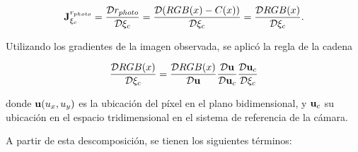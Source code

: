 \begin{equation}
\mathbf{J}_{\xi_c}^{r_{photo}} = \frac{\mathcal{D}r_{photo}}{\mathcal{D}\xi_c} = 
\frac{\mathcal{D}(RGB(x) - C(x))}{\mathcal{D}\xi_c} = \frac{\mathcal{D}RGB(x)}{\mathcal{D}\xi_c}.
\label{jacobiano_error_fotometrico}
\end{equation}

Utilizando los gradientes de la imagen observada, se aplicó la regla de la cadena

\begin{equation}
\frac{\mathcal{D}RGB(x)}{\mathcal{D}\xi_c} = \frac{\mathcal{D}RGB(x)}{\mathcal{D}\mathbf{u}} 
\frac{\mathcal{D}\mathbf{u}}{\mathcal{D}\mathbf{u}_c} \frac{\mathcal{D}\mathbf{u}_c}{\mathcal{D}\xi_c}
\end{equation}

\noindent donde $\mathbf{u}(u_x, u_y)$ es la ubicación del píxel en el plano bidimensional, y $\mathbf{u}_c$ su ubicación en el espacio tridimensional en el sistema de referencia de la cámara.

A partir de esta descomposición, se tienen los siguientes términos:

